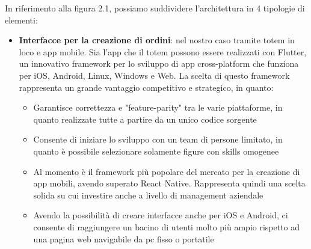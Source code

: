 \documentclass[a4paper, titlepage, 12pt, openright, twoside]{book}
\begin{document}
In riferimento alla figura 2.1, possiamo suddividere l'architettura in 4 tipologie di elementi:
\begin{itemize}
	\item \textbf{Interfacce per la creazione di ordini}: nel nostro caso tramite totem in loco e app mobile. Sia l'app che il totem possono essere realizzati con Flutter, un innovativo framework per lo sviluppo di app cross-platform che funziona per iOS, Android, Linux, Windows e Web. La scelta di questo framework rappresenta un grande
				 vantaggio competitivo e strategico, in quanto:
				 \begin{itemize}
				 	\item Garantisce correttezza e "feature-parity" tra le varie piattaforme, in quanto realizzate tutte a partire da un unico codice sorgente
				 	\item Consente di iniziare lo sviluppo con un team di persone limitato, in quanto è possibile selezionare solamente figure con skills omogenee
				 	\item Al momento è il framework più popolare del mercato per la creazione di app mobili, avendo superato React Native. Rappresenta quindi una scelta solida su cui investire anche a livello di management aziendale \cite{flutterreact}
				    \item Avendo la possibilità di creare interfacce anche per iOS e Android, ci consente di raggiungere un bacino di utenti molto più ampio rispetto ad una pagina web
				    	  navigabile da pc fisso o portatile \cite{hardwaremob}
				 \end{itemize}
				 

\end{itemize}
\end{document}
